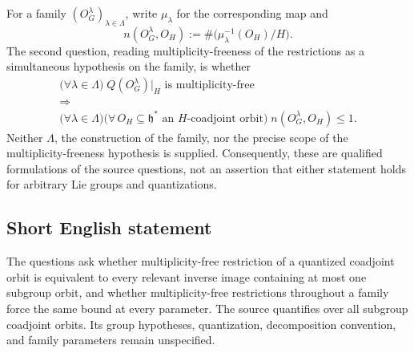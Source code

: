 \documentclass[11pt]{article}
\begin{document}
For a family \((O_G^\lambda)_{\lambda\in\Lambda}\), write \(\mu_\lambda\) for the corresponding map and
\[
n(O_G^\lambda,O_H)
:=\#\bigl(\mu_\lambda^{-1}(O_H)/H\bigr).
\]
The second question, reading multiplicity-freeness of the restrictions as a simultaneous hypothesis on the family, is whether
\[
\begin{gathered}
\bigl(\forall\lambda\in\Lambda\bigr)\;
Q(O_G^\lambda)|_H\text{ is multiplicity-free}
\\[2pt]
\Longrightarrow
\\[2pt]
\bigl(\forall\lambda\in\Lambda\bigr)
\bigl(\forall\,O_H\subseteq\mathfrak h^*\text{ an }H\text{-coadjoint orbit}\bigr)\;
n(O_G^\lambda,O_H)\leq1.
\end{gathered}
\]
Neither \(\Lambda\), the construction of the family, nor the precise scope of the multiplicity-freeness hypothesis is supplied. Consequently, these are qualified formulations of the source questions, not an assertion that either statement holds for arbitrary Lie groups and quantizations.
\subsection{Short English statement}
The questions ask whether multiplicity-free restriction of a quantized coadjoint orbit is equivalent to every relevant inverse image containing at most one subgroup orbit, and whether multiplicity-free restrictions throughout a family force the same bound at every parameter. The source quantifies over all subgroup coadjoint orbits. Its group hypotheses, quantization, decomposition convention, and family parameters remain unspecified.
\end{document}
